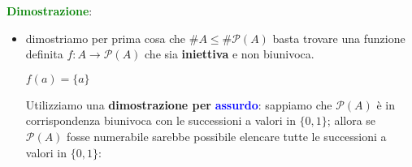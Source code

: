 \textcolor{green}{\textbf{Dimostrazione}}: 
\begin{itemize}
    \item dimostriamo per prima cosa che $\#A \leq \#\mathcal{P}(A)$ basta trovare una funzione definita $f : A \rightarrow \mathcal{P}(A)$ che sia \textbf{iniettiva} e non biunivoca.
    \begin{center}
        $f(a) = \{a\}$
    \end{center}
    Utilizziamo una \textbf{dimostrazione per} \textcolor{blue}{\textbf{assurdo}}: sappiamo che $\mathcal{P}(A)$ è in corrispondenza biunivoca con le successioni a valori in $\{0,1\}$; allora se $\mathcal{P}(A)$ fosse numerabile sarebbe possibile elencare tutte le successioni a valori in $\{0,1\}$:
\end{itemize}